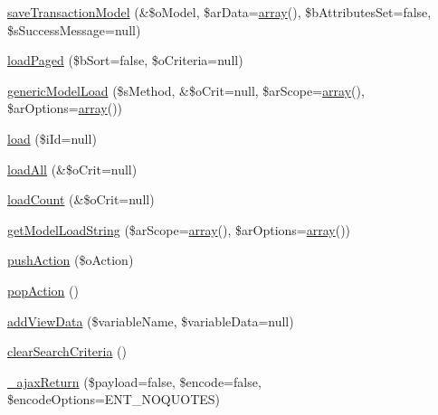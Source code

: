 \begin{DoxyCompactItemize}
\item 
\hyperlink{classCPSController_a73c5580cd2f21dbe67d7989423b846e0}{saveTransactionModel} (\&\$oModel, \$arData=\hyperlink{list_8php_aa3205d038c7f8feb5c9f01ac4dfadc88}{array}(), \$bAttributesSet=false, \$sSuccessMessage=null)
\item 
\hyperlink{classCPSController_a138d56ab26b272430a88450638c6d466}{loadPaged} (\$bSort=false, \$oCriteria=null)
\item 
\hyperlink{classCPSController_aacb2f651978f6aa962de80bc0248b3d9}{genericModelLoad} (\$sMethod, \&\$oCrit=null, \$arScope=\hyperlink{list_8php_aa3205d038c7f8feb5c9f01ac4dfadc88}{array}(), \$arOptions=\hyperlink{list_8php_aa3205d038c7f8feb5c9f01ac4dfadc88}{array}())
\item 
\hyperlink{classCPSController_affcc785cc14ed277532e5462fcb0463c}{load} (\$iId=null)
\item 
\hyperlink{classCPSController_a4e6ee9ca4aff15fe9592ad24f5ebd509}{loadAll} (\&\$oCrit=null)
\item 
\hyperlink{classCPSController_a97e32933f78c7a0e8e6829ac513deb4d}{loadCount} (\&\$oCrit=null)
\item 
\hyperlink{classCPSController_a594123c5fb3f7fab375d51468f7d5074}{getModelLoadString} (\$arScope=\hyperlink{list_8php_aa3205d038c7f8feb5c9f01ac4dfadc88}{array}(), \$arOptions=\hyperlink{list_8php_aa3205d038c7f8feb5c9f01ac4dfadc88}{array}())
\item 
\hyperlink{classCPSController_a12493e83d09e957f6d1f038aacff46da}{pushAction} (\$oAction)
\item 
\hyperlink{classCPSController_aaebe806c849a4c263ea874b67ba9c98b}{popAction} ()
\item 
\hyperlink{classCPSController_ac265d939123b5e6488026368b49ecd30}{addViewData} (\$variableName, \$variableData=null)
\item 
\hyperlink{classCPSController_aac45f7bcfa0fb866aff383996519ec35}{clearSearchCriteria} ()
\item 
\hyperlink{classCPSController_a7063f698c3d296c849e56a97a007b280}{\_\-ajaxReturn} (\$payload=false, \$encode=false, \$encodeOptions=ENT\_\-NOQUOTES)
\end{DoxyCompactItemize}
